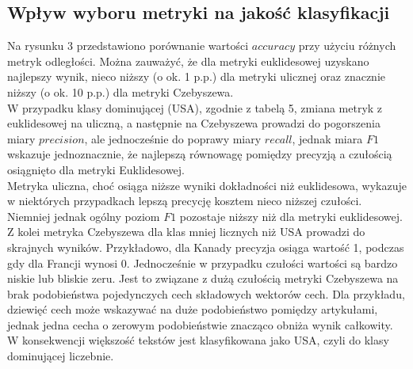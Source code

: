 \documentclass{article}
\begin{document}
\subsection{Wpływ wyboru metryki na jakość klasyfikacji}
Na rysunku 3 przedstawiono porównanie wartości \(accuracy\) przy użyciu różnych metryk odległości. Można zauważyć, że dla metryki euklidesowej uzyskano najlepszy wynik, nieco niższy (o ok. 1 p.p.) dla metryki ulicznej oraz znacznie niższy (o ok. 10 p.p.) dla metryki Czebyszewa.\\
W przypadku klasy dominującej (USA), zgodnie z tabelą 5, zmiana metryk z euklidesowej na uliczną, a następnie na Czebyszewa prowadzi do pogorszenia miary \(precision\), ale jednocześnie do poprawy miary \(recall\), jednak miara \(F1\) wskazuje jednoznacznie, że najlepszą równowagę pomiędzy precyzją a czułością osiągnięto dla metryki Euklidesowej. \\
Metryka uliczna, choć osiąga niższe wyniki dokładności niż euklidesowa, wykazuje w niektórych przypadkach lepszą precycję kosztem nieco niższej czułości. Niemniej jednak ogólny poziom \(F1\) pozostaje niższy niż dla metryki euklidesowej. \\
Z kolei metryka Czebyszewa dla klas mniej licznych niż USA prowadzi do skrajnych wyników. Przykładowo, dla Kanady precyzja osiąga wartość 1, podczas gdy dla Francji wynosi 0. Jednocześnie w przypadku czułości wartości są bardzo niskie lub bliskie zeru. Jest to związane z dużą czułością metryki Czebyszewa na brak podobieństwa pojedynczych cech składowych wektorów cech. Dla przykładu, dziewięć cech może wskazywać na duże podobieństwo pomiędzy artykułami, jednak jedna cecha o zerowym podobieństwie znacząco obniża wynik całkowity. W konsekwencji większość tekstów jest klasyfikowana jako USA, czyli do klasy dominującej liczebnie.
\end{document}
